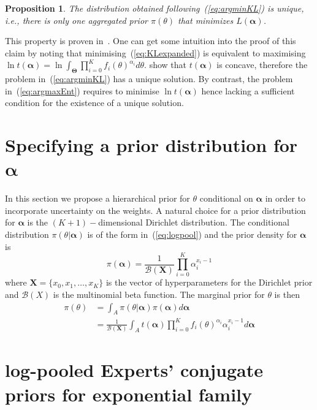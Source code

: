 \documentclass[a4paper, notitlepage, 11pt]{article}
\newtheorem{proposition}{Proposition}[]
\begin{document}
\begin{proposition}
\label{prop:uniqueness}
 The distribution obtained following~(\ref{eq:argminKL}) is unique, i.e., there is only one aggregated prior $\pi(\theta)$ that minimizes $L(\boldsymbol\alpha)$.
\end{proposition}
This property is proven in~\cite{rufo2012A}.
One can get some intuition into the proof  of this claim by noting that minimising~(\ref{eq:KLexpanded}) is equivalent to maximising $\ln t(\boldsymbol\alpha) = \ln\int_{\boldsymbol\Theta}\prod_{i=0}^{K}f_i(\theta)^{\alpha_i}d\theta$. 
\cite{rufo2012A} show that $t(\boldsymbol\alpha)$ is concave, therefore the problem in~(\ref{eq:argminKL}) has a unique solution.
By contrast, the problem in~(\ref{eq:argmaxEnt}) requires to minimise $\ln t(\boldsymbol\alpha)$ hence lacking a sufficient condition for the existence of a unique solution.

\section*{Specifying a prior distribution for $\boldsymbol\alpha$}

In this section we propose a hierarchical prior for $\theta$ conditional on $\boldsymbol\alpha$ in order to incorporate uncertainty on the weights.
A natural choice for a prior distribution for $\boldsymbol\alpha$ is the $(K+1)-$dimensional Dirichlet distribution.
The conditional distribution $\pi(\theta|\boldsymbol\alpha)$ is of the form in~(\ref{eq:logpool}) and the prior density for $\boldsymbol\alpha$ is 
\begin{equation}
 \label{eq:generalcondprior}
 \pi(\boldsymbol\alpha) = \frac{1}{\mathcal{B}(\boldsymbol X)}\prod_{i=0}^K \alpha_i^{x_i-1}
\end{equation}
where $\boldsymbol X = \{ x_0, x_1, \ldots, x_K\}$ is the vector of hyperparameters for the Dirichlet prior and $\mathcal{B}(X)$ is the multinomial beta function.
The marginal prior for $\theta$ is then
\begin{align}
 \label{eq:marginalhierprior}
 \pi(\theta) &= \int_{A}\pi(\theta|\boldsymbol\alpha)\pi(\boldsymbol\alpha)d\boldsymbol\alpha \\
             &= \frac{1}{\mathcal{B}(\boldsymbol X)}\int_{A}t(\boldsymbol\alpha)\prod_{i=0}^K f_i(\theta)^{\alpha_i}\alpha_i^{x_i-1}d\boldsymbol\alpha 
\end{align}


\section*{log-pooled Experts' conjugate priors for exponential family}
\end{document}
